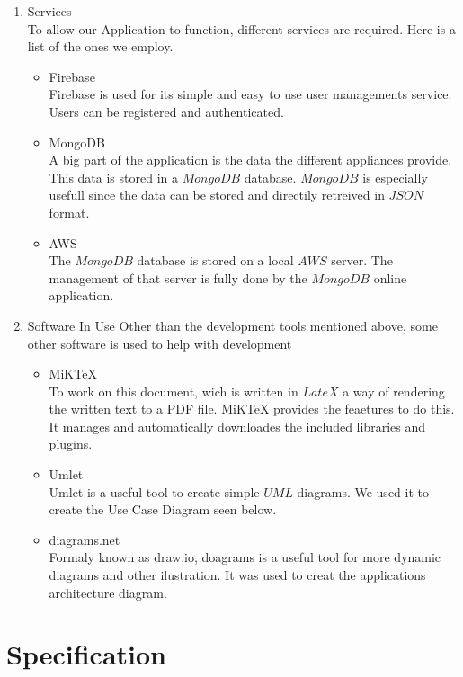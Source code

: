\documentclass[10pt]{article}
\begin{document}
\begin{multicols*}{2}
\begin{enumerate}
  \item {Services} \\
  To allow our Application to function, different services are required. Here is a list of the ones we employ.
  \begin{itemize}
    \item {Firebase} \\
    Firebase is used for its simple and easy to use user managements service. Users can be registered and authenticated.
    \item {MongoDB} \\
    A big part of the application is the data the different appliances provide. This data is stored in a $MongoDB$ database. $MongoDB$ is especially usefull since the data can be stored and directily retreived in $JSON$ format.
    \item {AWS} \\
    The $MongoDB$ database is stored on a local $AWS$ server. The management of that server is fully done by the $MongoDB$ online application.
  \end{itemize}

  \item {Software In Use}
  Other than the development tools mentioned above, some other software is used to help with development
  \begin{itemize}
    \item {MiKTeX} \\
    To work on this document, wich is written in $LateX$ a way of rendering the written text to a PDF file. MiKTeX provides the feaetures to do this. It manages and automatically downloades the included libraries and plugins.
    \item {Umlet} \\
    Umlet is a useful tool to create simple $UML$ diagrams. We used it to create the Use Case Diagram seen below.
    \item {diagrams.net} \\
    Formaly known as draw.io, doagrams is a useful tool for more dynamic diagrams and other ilustration. It was used to creat the applications architecture diagram.
    
  \end{itemize}
\end{enumerate}

\clearpage

\section{Specification}


\end{multicols*}
\end{document}
